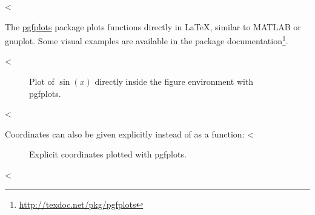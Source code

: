 <%

The \href{https://ctan.org/pkg/pgfplots}{pgfplots} package plots functions directly in \LaTeX{}, similar to MATLAB or gnuplot.
Some visual examples are available in the package documentation\footnote{\url{http://texdoc.net/pkg/pgfplots}}.

<%
\begin{figure}[ht]
  \centering
  \caption{Plot of $\sin(x)$ directly inside the figure environment with pgfplots.}
  \label{fig:pgfplots_example}
\end{figure}
<%

Coordinates can also be given explicitly instead of as a function:
<%
\begin{figure}[ht]
  \centering
  \caption{Explicit coordinates plotted with pgfplots.}
  \label{fig:pgfplots_coords}
\end{figure}
<%
